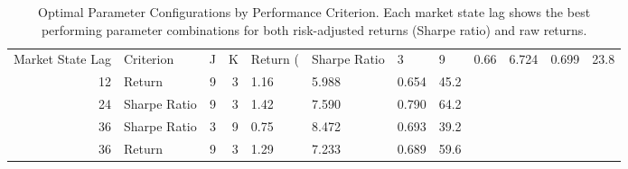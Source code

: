 \begin{table}[htbp]
\caption{Optimal Parameter Configurations by Performance Criterion. Each market state lag shows the best performing parameter combinations for both risk-adjusted returns (Sharpe ratio) and raw returns.}
\label{tab:optimal_configs}
\begin{tabular}{rlrrllll}
\toprule
Market State Lag & Criterion & J & K & Return (%
 & Sharpe Ratio & 3 & 9 & 0.66 & 6.724 & 0.699 & 23.8 \\
12 & Return & 9 & 3 & 1.16 & 5.988 & 0.654 & 45.2 \\
24 & Sharpe Ratio & 9 & 3 & 1.42 & 7.590 & 0.790 & 64.2 \\
36 & Sharpe Ratio & 3 & 9 & 0.75 & 8.472 & 0.693 & 39.2 \\
36 & Return & 9 & 3 & 1.29 & 7.233 & 0.689 & 59.6 \\
\bottomrule
\end{tabular}
\end{table}
